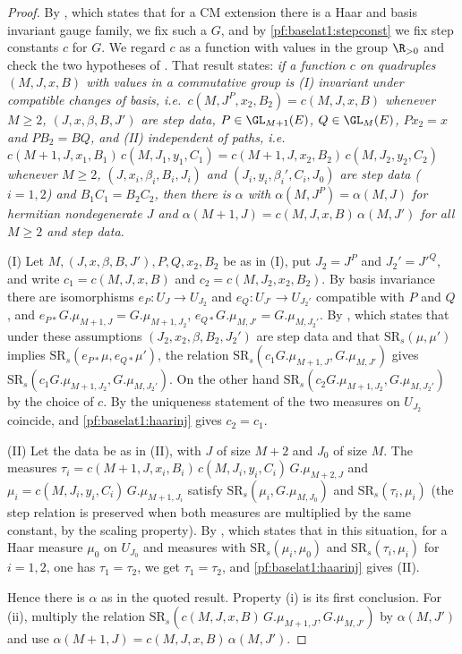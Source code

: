 \begin{proof}
By , which states that for a CM
extension there is a Haar and basis invariant gauge family, we fix such a $G$, and by \cref{pf:baselat1:stepconst}
we fix step constants $c$ for $G$. We regard $c$ as a function with values in the group $\R_{>0}$ and check the two
hypotheses of . That result states:
\emph{if a function $c$ on quadruples $(M,J,x,B)$ with values in a commutative group is (I) invariant under
compatible changes of basis, i.e.\ $c(M,J^P,x_2,B_2)=c(M,J,x,B)$ whenever $M\ge2$, $(J,x,\beta,B,J')$ are step data,
$P\in\GL_{M+1}(E)$, $Q\in\GL_M(E)$, $Px_2=x$ and $PB_2=BQ$, and (II) independent of paths, i.e.\
$c(M+1,J,x_1,B_1)\,c(M,J_1,y_1,C_1)=c(M+1,J,x_2,B_2)\,c(M,J_2,y_2,C_2)$ whenever $M\ge2$, $(J,x_i,\beta_i,B_i,J_i)$ and
$(J_i,y_i,\beta_i',C_i,J_0)$ are step data ($i=1,2$) and $B_1C_1=B_2C_2$, then there is $\alpha$ with
$\alpha(M,J^P)=\alpha(M,J)$ for hermitian nondegenerate $J$ and $\alpha(M+1,J)=c(M,J,x,B)\,\alpha(M,J')$ for all
$M\ge2$ and step data.}

(I) Let $M,(J,x,\beta,B,J'),P,Q,x_2,B_2$ be as in (I), put $J_2=J^P$ and $J_2'=J'^Q$, and write $c_1=c(M,J,x,B)$ and
$c_2=c(M,J_2,x_2,B_2)$. By basis invariance there are isomorphisms $e_P\colon U_J\to U_{J_2}$ and
$e_Q\colon U_{J'}\to U_{J_2'}$ compatible with $P$ and $Q$, and $e_{P*}G.\mu_{M+1,J}=G.\mu_{M+1,J_2}$,
$e_{Q*}G.\mu_{M,J'}=G.\mu_{M,J_2'}$. By
, which states that under these
assumptions $(J_2,x_2,\beta,B_2,J_2')$ are step data and that $\mathrm{SR}_s(\mu,\mu')$ implies
$\mathrm{SR}_s(e_{P*}\mu,e_{Q*}\mu')$, the relation $\mathrm{SR}_s(c_1G.\mu_{M+1,J},G.\mu_{M,J'})$ gives
$\mathrm{SR}_s(c_1G.\mu_{M+1,J_2},G.\mu_{M,J_2'})$. On the other hand $\mathrm{SR}_s(c_2G.\mu_{M+1,J_2},G.\mu_{M,J_2'})$
by the choice of $c$. By the uniqueness statement of
 the two measures on $U_{J_2}$ coincide, and
\cref{pf:baselat1:haarinj} gives $c_2=c_1$.

(II) Let the data be as in (II), with $J$ of size $M+2$ and $J_0$ of size $M$. The measures
$\tau_i=c(M+1,J,x_i,B_i)\,c(M,J_i,y_i,C_i)\,G.\mu_{M+2,J}$ and $\mu_i=c(M,J_i,y_i,C_i)\,G.\mu_{M+1,J_i}$ satisfy
$\mathrm{SR}_s(\mu_i,G.\mu_{M,J_0})$ and $\mathrm{SR}_s(\tau_i,\mu_i)$ (the step relation is preserved when both measures
are multiplied by the same constant, by the scaling property). By
, which states that in this situation, for
a Haar measure $\mu_0$ on $U_{J_0}$ and measures with $\mathrm{SR}_s(\mu_i,\mu_0)$ and $\mathrm{SR}_s(\tau_i,\mu_i)$ for
$i=1,2$, one has $\tau_1=\tau_2$, we get $\tau_1=\tau_2$, and \cref{pf:baselat1:haarinj} gives (II).

Hence there is $\alpha$ as in the quoted result. Property (i) is its first conclusion. For (ii), multiply the
relation $\mathrm{SR}_s(c(M,J,x,B)\,G.\mu_{M+1,J},G.\mu_{M,J'})$ by $\alpha(M,J')$ and use
$\alpha(M+1,J)=c(M,J,x,B)\,\alpha(M,J')$.
\end{proof}

